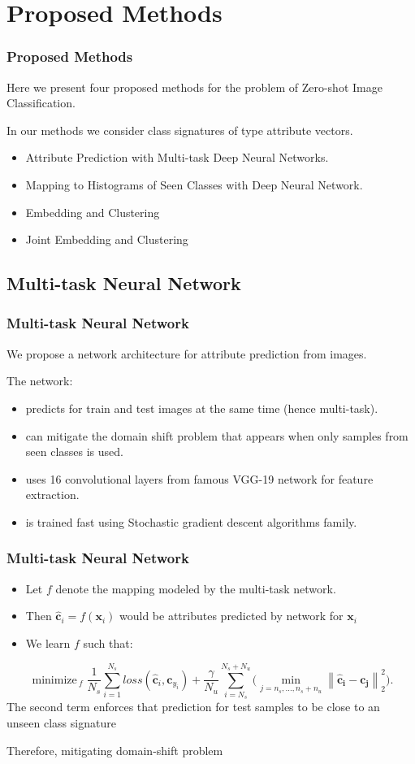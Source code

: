 \documentclass{beamer}
\DeclareMathOperator*{\minimize}{minimize\,}
\newcommand{\normtwo}[1]{\left \lVert #1 \right \rVert_2^2}
\begin{document}
\section{Proposed Methods}
\begin{frame}\frametitle{Proposed Methods}
Here we present four proposed methods for the problem of Zero-shot Image Classification.

In our methods we consider class signatures of type attribute vectors.

\begin{itemize}
  \item Attribute Prediction with Multi-task Deep Neural Networks.
  \item Mapping to Histograms of Seen Classes with Deep Neural Network.
  \item Embedding and Clustering
  \item Joint Embedding and Clustering
\end{itemize}
\end{frame}

\subsection{Multi-task Neural Network}
\begin{frame}\frametitle{Multi-task Neural Network}
  We propose a network architecture for attribute prediction from images.

  The network:
\begin{itemize}
  \item  predicts for train and test images at the same time (hence multi-task).
  \item can mitigate the domain shift problem that appears when only samples from seen classes is used.
  \item uses 16 convolutional layers from famous VGG-19 network \cite{vgg}  for feature extraction.
  \item is trained fast using Stochastic gradient descent algorithms family.
\end{itemize}
\end{frame}

\begin{frame}\frametitle{Multi-task Neural Network}
\begin{itemize}
\item[] Let $f$ denote the mapping modeled by the multi-task network.
\item[] Then  $\mathbf{\hat{c}}_i = f (\mathbf{x}_i) $ would be attributes predicted by network for $\mathbf{x}_i$
\item[] We learn $f$ such that:
\end{itemize}
  \begin{equation}
\label{eq:nn_loss}
\minimize_{f}
\frac{1}{N_s} \sum_{i=1}^{N_s} loss(\mathbf{\hat{c}}_i, \mathbf{c}_{y_i}) +
\frac{\gamma}{N_u} \sum_{i=N_s}^{N_s+N_u} \Big ( \min_{j=n_s,\ldots,n_s + n_u} \normtwo{\mathbf{\hat{c}_i - c_j}} \Big ).
\end{equation}
The second term enforces that prediction for test samples to be close to an unseen class signature

Therefore, mitigating domain-shift problem
\end{frame}
\end{document}
